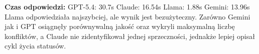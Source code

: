 \documentclass[12pt,a4paper]{article}
\begin{document}
\vspace{0.5em}
\begin{mdframed}[backgroundcolor=metabg, linewidth=0pt, innerleftmargin=10pt, innerrightmargin=10pt, innertopmargin=6pt, innerbottommargin=6pt]
\small
\textbf{Czas odpowiedzi:} GPT-5.4: 30.7s \quad Claude: 16.54s \quad Llama: 1.88s \quad Gemini: 13.96s\\
Llama odpowiedziała najszybciej, ale wynik jest bezużyteczny. Zarówno Gemini jak i GPT osiągnęły porównywalną jakość oraz wykryli maksymalną liczbę konfliktów, a Claude nie zidentyfikował jednej sprzeczności, jednakże lepiej opisał cykl życia statusów.
\end{mdframed}
\end{document}
